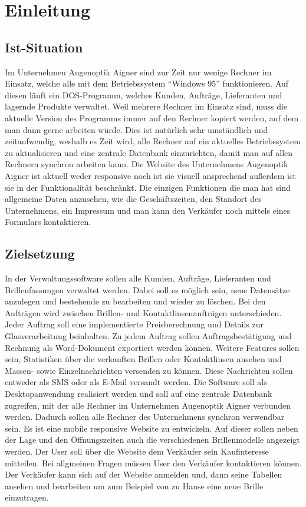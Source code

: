 \chapter{Einleitung}
\section{Ist-Situation}
Im Unternehmen Augenoptik Aigner sind zur Zeit nur wenige Rechner im Einsatz, welche alle mit dem Betriebssystem “Windows 95” funktionieren. Auf diesen läuft ein DOS-Programm, welches Kunden,  Aufträge, Lieferanten und lagernde Produkte  verwaltet. Weil mehrere Rechner im Einsatz sind, muss die aktuelle Version des Programms immer auf den Rechner kopiert werden, auf dem man dann gerne arbeiten würde. Dies ist natürlich sehr umständlich und zeitaufwendig, weshalb es Zeit wird, alle Rechner auf ein aktuelles Betriebssystem zu aktualisieren und eine zentrale Datenbank einzurichten, damit man auf allen Rechnern synchron arbeiten kann.\newline
Die Website des Unternehmens Augenoptik Aigner ist aktuell weder responsive noch ist sie visuell ansprechend außerdem ist sie in der Funktionalität beschränkt. Die einzigen Funktionen die man hat sind allgemeine Daten anzusehen, wie die Geschäftszeiten, den Standort des Unternehmens, ein Impressum und man kann den Verkäufer noch mittels eines Formulars kontaktieren. 

\section{Zielsetzung}
In der Verwaltungssoftware sollen alle Kunden, Aufträge, Lieferanten und Brillenfassungen verwaltet werden. Dabei soll es möglich sein, neue Datensätze anzulegen und bestehende zu bearbeiten und wieder zu löschen. Bei den Aufträgen wird zwischen Brillen- und Kontaktlinsenaufträgen unterschieden. Jeder Auftrag soll eine implementierte Preisberechnung und Details zur Glasverarbeitung beinhalten. Zu jedem Auftrag sollen Auftragsbestätigung und Rechnung als Word-Dokument exportiert werden können. \newline Weitere Features sollen sein, Statistiken über die verkauften Brillen oder Kontaktlinsen ansehen und Massen- sowie Einzelnachrichten versenden zu können. Diese Nachrichten sollen entweder als SMS oder als E-Mail versandt werden. \newline Die Software soll als Desktopanwendung realisiert werden und soll auf eine zentrale Datenbank zugreifen, mit der alle Rechner im Unternehmen Augenoptik Aigner verbunden werden. Dadurch sollen alle Rechner des Unternehmens synchron verwendbar sein.
Es ist eine mobile responsive Website zu entwickeln. Auf dieser sollen neben der Lage und den Öffnungszeiten auch die verschiedenen Brillenmodelle angezeigt werden. Der User soll über die Website dem Verkäufer sein Kaufinteresse mitteilen. Bei allgmeinen Fragen müssen User den Verkäufer kontaktieren können. Der Verkäufer kann sich auf der Website anmelden und, dann seine Tabellen ansehen und bearbeiten um zum Beispiel von zu Hause eine neue Brille einzutragen. 

